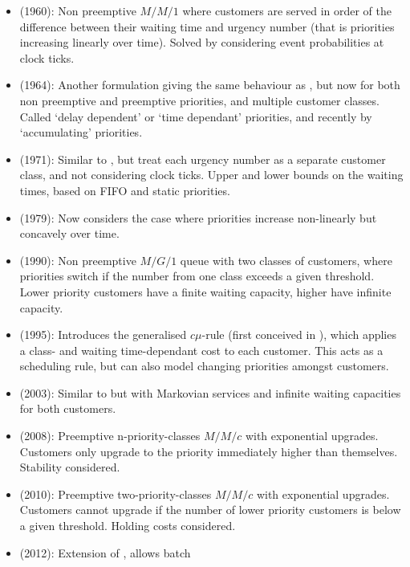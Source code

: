 \documentclass{article}
\begin{document}
\begin{itemize}
  \item \cite{jackson60} (1960): Non preemptive $M/M/1$ where customers
      are served in order of the difference between their waiting time
        and urgency number (that is priorities increasing linearly over
        time). Solved by considering event probabilities at clock ticks.
  \item \cite{kleinrock164} (1964): Another formulation giving the same
      behaviour as \cite{jackson60}, but now for both non preemptive and
        preemptive priorities, and multiple customer classes. Called `delay
        dependent' or `time dependant' priorities, and recently by
        `accumulating' priorities.
  \item \cite{holtzman71} (1971): Similar to \cite{jackson60}, but treat each
      urgency number as a separate customer class, and not considering
        clock ticks. Upper and lower bounds on the waiting times, based
        on FIFO and static priorities.
  \item \cite{netterman79} (1979): Now considers the case where
      priorities increase non-linearly but concavely over time.
  \item \cite{fratini90} (1990): Non preemptive $M/G/1$ queue with two
      classes of customers, where priorities switch if the number from
        one class exceeds a given threshold. Lower priority customers
        have a finite waiting capacity, higher have infinite capacity.
  \item \cite{vanmieghan95} (1995): Introduces the generalised $c\mu$-rule
    (first conceived in \cite{smith56}), which applies a class- and waiting
      time-dependant cost to each customer. This acts as a scheduling rule,
      but can also model changing priorities amongst customers.
  \item \cite{knessl03} (2003): Similar to \cite{fratini90} but with Markovian
      services and infinite waiting capacities for both customers.
  \item \cite{xie08} (2008): Preemptive n-priority-classes $M/M/c$ with
      exponential upgrades. Customers only upgrade to the priority
        immediately higher than themselves. Stability considered.
  \item \cite{down10} (2010): Preemptive two-priority-classes $M/M/c$ with
      exponential upgrades. Customers cannot upgrade if the number of
        lower priority customers is below a given threshold. Holding
        costs considered.
  \item \cite{he12} (2012): Extension of \cite{down10}, allows batch

\end{itemize}
\end{document}
